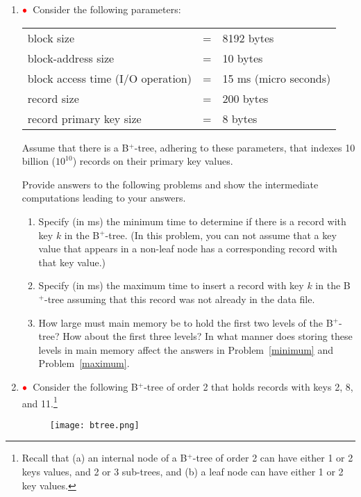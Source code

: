 \documentclass{article}
\newcommand{\redbullet}{$\textcolor{red}{\bullet}$}
\begin{document}
\begin{enumerate}[resume]
\item \redbullet\ 
Consider the following parameters:
\begin{center}
\begin{tabular}{lcl}
block size         & = & 8192 bytes \\
block-address size & = & 10 bytes \\
block access time (I/O operation) & = & 15 ms (micro seconds) \\
record size       & = & 200 bytes \\
record primary key size   & = & 8 bytes \\
\end{tabular}
\end{center}
Assume that there is a B$^+$-tree, adhering to these parameters, that
indexes 10 billion ($10^{10}$) records on their primary key values.

Provide answers to the following problems and show the intermediate computations leading to your answers.

\begin{enumerate}
\item\label{minimum}   Specify (in ms) the minimum time to determine if there is a record with
  key $k$ in the B$^+$-tree.
(In this problem, you can not assume that a key value that appears in a non-leaf node has a corresponding record with that key value.)

\item \label{maximum} Specify (in ms) the maximum time to insert a record
with key $k$ in the B$^+$-tree assuming that this record was not already in the data file.

\item  How large must main memory be to hold the first two levels of the B$^+$-tree? How about the first three levels?   In what manner does storing these levels in main memory affect the answers
in Problem~\ref{minimum} and Problem~\ref{maximum}. 
\end{enumerate}

\newpage
\item \redbullet\  Consider the following B$^+$-tree of order 2 that holds records
  with keys 2, 8, and 11.\footnote{Recall that (a) an internal node of a
  B$^+$-tree of order 2 can have either 1 or 2 keys values, and 2 or 3
  sub-trees, and (b) a leaf node can have either 1 or 2 key values.}
  
\begin{figure}[h]
\centering
\texttt{[image: btree.png]}
\end{figure}
\begin{enumerate}


\end{enumerate}
\end{enumerate}
\end{document}
